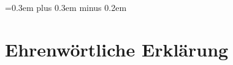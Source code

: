 \documentclass[
	12pt, %
	a4paper,
	bibliography=totoc, %
	numbers=noenddot, %
	ngerman, %
	headsepline, %
	oneside %
	]{scrbook} %
\begin{document}
\spaceskip=0.3em plus 0.3em minus 0.2em
\printbibliography


\chapter{Ehrenwörtliche Erklärung}

\end{document}
